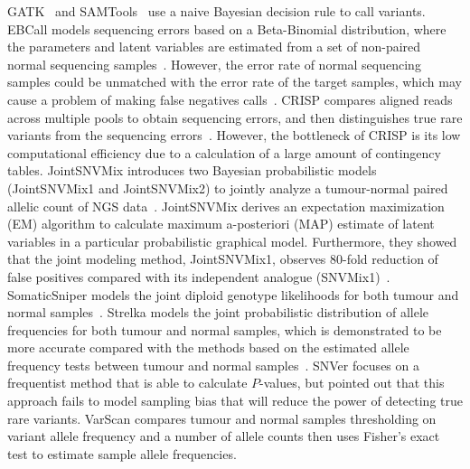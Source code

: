 \documentclass{bmcart}
\begin{document}
GATK~\cite{mckenna2010genome} and SAMTools~\cite{li2009sequence} use a naive Bayesian decision rule to call variants.
EBCall models sequencing errors based on a Beta-Binomial distribution, where the parameters and latent variables are estimated from a set of non-paired normal sequencing samples~\cite{shiraishi2013empirical}.
However, the error rate of normal sequencing samples could be unmatched with the error rate of the target samples, which may cause a problem of making false negatives calls~\cite{wang2013detecting}.
CRISP compares aligned reads across multiple pools to obtain sequencing errors, and then distinguishes true rare variants from the sequencing errors~\cite{bansal2010statistical}.
However, the bottleneck of CRISP is its low computational efficiency due to a calculation of a large amount of contingency tables.
%
JointSNVMix introduces two Bayesian probabilistic models (JointSNVMix1 and JointSNVMix2) to jointly analyze a tumour-normal paired allelic count of NGS data~\cite{roth2012jointsnvmix}.
JointSNVMix derives an expectation maximization (EM) algorithm to calculate maximum a-posteriori (MAP) estimate of latent variables in a particular probabilistic graphical model.
Furthermore, they showed that the joint modeling method, JointSNVMix1, observes 80-fold reduction of false positives compared with its independent analogue (SNVMix1)~\cite{roth2012jointsnvmix}.
SomaticSniper models the joint diploid genotype likelihoods for both tumour and normal samples~\cite{larson2012somaticsniper}.
Strelka models the joint probabilistic distribution of allele frequencies for both tumour and normal samples, which is demonstrated to be more accurate compared with the methods based on the estimated allele frequency tests between tumour and normal samples~\cite{saunders2012strelka}.
SNVer focuses on a frequentist method that is able to calculate $P$-values, but \cite{wei2011snver} pointed out that this approach fails to model sampling bias that will reduce the power of detecting true rare variants.
VarScan compares tumour and normal samples thresholding on variant allele frequency and a number of allele counts then uses Fisher's exact test to estimate sample allele frequencies\cite{koboldt2012varscan}.
\end{document}
